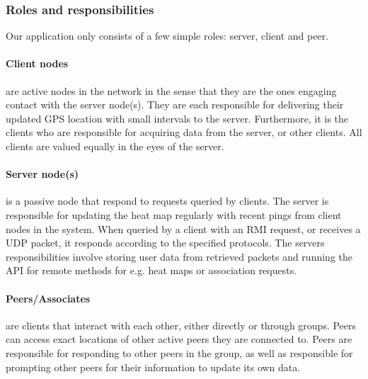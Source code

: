 




\subsubsection{Roles and responsibilities}

Our application only consists of a few simple roles: server, client and peer.%
%
\paragraph{Client nodes} are active nodes in the network in the sense that they are the ones engaging contact with the server node(s). They are each responsible for delivering their updated GPS location with small intervals to the server. Furthermore, it is the clients who are responsible for acquiring data from the server, or other clients. All clients are valued equally in the eyes of the server.

\paragraph{Server node(s)} is a passive node that respond to requests queried by clients. The server is responsible for updating the heat map regularly with recent pings from client nodes in the system. When queried by a client with an RMI request, or receives a UDP packet, it responds according to the specified protocols. The servers responsibilities involve storing user data from retrieved packets and running the API for remote methods for e.g. heat maps or association requests.

\paragraph{Peers/Associates} are clients that interact with each other, either directly or through groups. Peers can access exact locations of other active peers they are connected to. Peers are responsible for responding to other peers in the group, as well as responsible for prompting other peers for their information to update its own data.